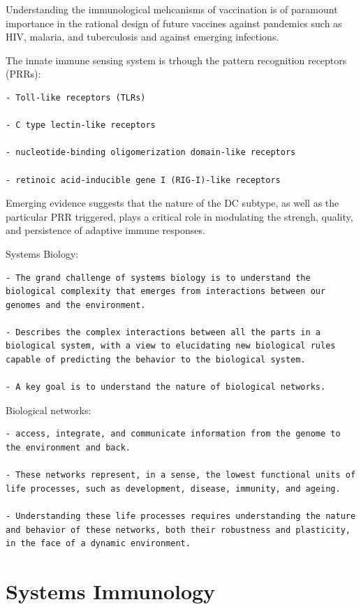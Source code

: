 \documentclass[
]{book}
\begin{document}
Understanding the immunological mehcanisms of vaccination is of paramount importance in the rational design of future vaccines against pandemics such as HIV, malaria, and tuberculosis and against emerging infections.

The innate immune sensing system is trhough the pattern recognition receptors (PRRs):

\begin{verbatim}
- Toll-like receptors (TLRs)

- C type lectin-like receptors

- nucleotide-binding oligomerization domain-like receptors

- retinoic acid-inducible gene I (RIG-I)-like receptors
\end{verbatim}

Emerging evidence suggests that the nature of the DC subtype, as well as the particular PRR triggered, plays a critical role in modulating the strengh, quality, and persistence of adaptive immune responses.

Systems Biology:

\begin{verbatim}
- The grand challenge of systems biology is to understand the biological complexity that emerges from interactions between our genomes and the environment.

- Describes the complex interactions between all the parts in a biological system, with a view to elucidating new biological rules capable of predicting the behavior to the biological system.

- A key goal is to understand the nature of biological networks.
\end{verbatim}

Biological networks:

\begin{verbatim}
- access, integrate, and communicate information from the genome to the environment and back.

- These networks represent, in a sense, the lowest functional units of life processes, such as development, disease, immunity, and ageing.

- Understanding these life processes requires understanding the nature and behavior of these networks, both their robustness and plasticity, in the face of a dynamic environment.
\end{verbatim}

\hypertarget{systems-immunology}{%
\section{Systems Immunology}\label{systems-immunology}}
\end{document}

